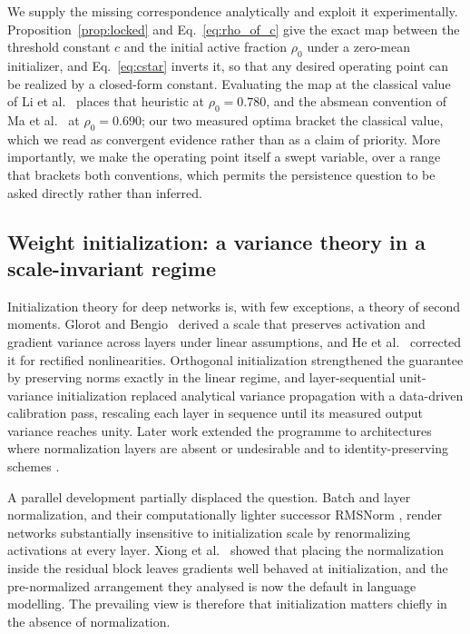 \documentclass[final,5p,times,twocolumn]{elsarticle}
\theoremstyle{remark}
\newcommand{\rhoz}{\rho_{0}}
\begin{document}
We supply the missing correspondence analytically and exploit it
experimentally. Proposition~\ref{prop:locked} and Eq.~\eqref{eq:rho_of_c} give
the exact map between the threshold constant $c$ and the initial active
fraction $\rhoz$ under a zero-mean initializer, and Eq.~\eqref{eq:cstar}
inverts it, so that any desired operating point can be realized by a
closed-form constant. Evaluating the map at the classical value of
Li et al.~\cite{li2016} places that heuristic at $\rhoz = 0.780$, and the
absmean convention of Ma et al.~\cite{ma2024} at $\rhoz = 0.690$; our two
measured optima bracket the classical value, which we read as convergent
evidence rather than as a claim of priority. More importantly, we make the
operating point itself a swept variable, over a range that brackets both
conventions, which permits the persistence question to be asked directly
rather than inferred.

\subsection{Weight initialization: a variance theory in a scale-invariant regime}
\label{sec:rel-init}

Initialization theory for deep networks is, with few exceptions, a theory of
second moments. Glorot and Bengio~\cite{glorot2010} derived a scale that preserves activation
and gradient variance across layers under linear assumptions, and
He et al.~\cite{he2015} corrected it for rectified nonlinearities. Orthogonal
initialization \cite{saxe2014} strengthened the guarantee by preserving norms
exactly in the linear regime, and layer-sequential unit-variance initialization
\cite{mishkin2016} replaced analytical variance propagation with a
data-driven calibration pass, rescaling each layer in sequence until its
measured output variance reaches unity. Later work extended the programme to
architectures where normalization layers are absent or undesirable
\cite{zhang2019a,huang2020} and to identity-preserving schemes
\cite{zhao2022}.

A parallel development partially displaced the question. Batch
\cite{ioffe2015} and layer \cite{ba2016} normalization, and their
computationally lighter successor RMSNorm \cite{zhang2019b}, render networks
substantially insensitive to initialization scale by renormalizing activations
at every layer. Xiong et al.~\cite{xiong2020} showed that placing the
normalization inside the residual block leaves gradients well behaved at
initialization, and the pre-normalized arrangement they analysed is now the
default in language modelling. The prevailing view is therefore that
initialization matters chiefly in the absence of normalization.
\end{document}
